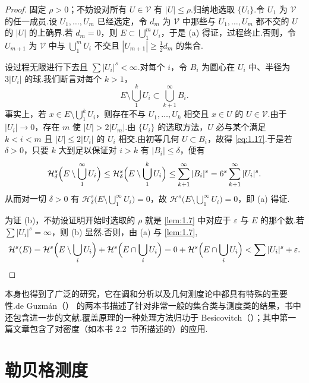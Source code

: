 \begin{proof}
固定 $\rho>0$；不妨设对所有 $U\in\mathcal{V}$ 有 $|U|\leq\rho$.归纳地选取 $\{U_i\}$.令 $U_1$ 为 $\mathcal{V}$ 的任一成员.设 $U_1,\ldots,U_m$ 已经选定，令 $d_m$ 为 $\mathcal{V}$ 中那些与 $U_1,\ldots,U_m$ 都不交的 $U$ 的 $|U|$ 的上确界.若 $d_m=0$，则 $E\subset\bigcup_{1}^{m}U_i$，于是 (a) 得证，过程终止.否则，令 $U_{m+1}$ 为 $\mathcal{V}$ 中与 $\bigcup_{1}^{m}U_i$ 不交且 $|U_{m+1}|\geq\frac{1}{2}d_m$ 的集合.

设过程无限进行下去且 $\sum|U_i|^s<\infty$.对每个 $i$，令 $B_i$ 为圆心在 $U_i$ 中、半径为 $3|U_i|$ 的球.我们断言对每个 $k>1$，
\begin{equation}\label{eq:1.17}
  E\setminus\bigcup_{1}^{k}U_i\subset\bigcup_{k+1}^{\infty}B_i.
\end{equation}
事实上，若 $x\in E\setminus\bigcup_{1}^{k}U_i$，则存在不与 $U_1,\ldots,U_k$ 相交且 $x\in U$ 的 $U\in\mathcal{V}$.由于 $|U_i|\to 0$，存在 $m$ 使 $|U|>2|U_m|$.由 $\{U_i\}$ 的选取方法，$U$ 必与某个满足 $k<i<m$ 且 $|U|\leq 2|U_i|$ 的 $U_i$ 相交.由初等几何 $U\subset B_i$，故得 \eqref{eq:1.17}.于是若 $\delta>0$，只要 $k$ 大到足以保证对 $i>k$ 有 $|B_i|\leq\delta$，便有
\[
  \mathcal{H}^{s}_{\delta}\Bigl(E\setminus\bigcup_{1}^{\infty}U_i\Bigr)
  \leq\mathcal{H}^{s}_{\delta}\Bigl(E\setminus\bigcup_{1}^{k}U_i\Bigr)
  \leq\sum_{k+1}^{\infty}|B_i|^{s}
  =6^{s}\sum_{k+1}^{\infty}|U_i|^{s}.
\]
从而对一切 $\delta>0$ 有 $\mathcal{H}^s_{\delta}\bigl(E\setminus\bigcup_{1}^{\infty}U_i\bigr)=0$，故 $\mathcal{H}^s\bigl(E\setminus\bigcup_{1}^{\infty}U_i\bigr)=0$，即 (a) 得证.

为证 (b)，不妨设证明开始时选取的 $\rho$ 就是 \cref{lem:1.7} 中对应于 $\varepsilon$ 与 $E$ 的那个数.若 $\sum|U_i|^s=\infty$，则 (b) 显然.否则，由 (a) 与 \cref{lem:1.7},
\[
  \mathcal{H}^{s}(E)
  =\mathcal{H}^{s}\Bigl(E\setminus\bigcup_{i}U_i\Bigr)+\mathcal{H}^{s}\Bigl(E\cap\bigcup_{i}U_i\Bigr)
  =0+\mathcal{H}^{s}\Bigl(E\cap\bigcup_{i}U_i\Bigr)
  <\sum|U_i|^{s}+\varepsilon. \qedhere
\]
\end{proof}

本身也得到了广泛的研究，它在调和分析以及几何测度论中都具有特殊的重要性.de Guzmán（\citeyear{deguzman1975,deguzman1981}） 的两本书描述了针对非常一般的集合类与测度类的结果，书中还包含进一步的文献.覆盖原理的一种处理方法归功于 Besicovitch（\citeyear{besicovitch1945a,besicovitch1946,besicovitch1947}）；其中第一篇文章包含了对密度（如本书 2.2~节所描述的）的应用.

\section{勒贝格测度}


